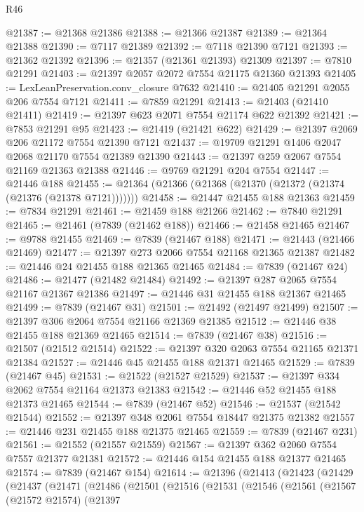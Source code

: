 \begin{lexlean}{R46}
\begin{coremodule}
@21387 := @21368 @21386
@21388 := @21366 @21387
@21389 := @21364 @21388
@21390 := @7117 @21389
@21392 := @7118 @21390 @7121
@21393 := @21362 @21392
@21396 := @21357 (@21361 @21393) @21309
@21397 := @7810 @21291
@21403 := @21397 @2057 @2072 @7554 @21175 @21360 @21393
@21405 := LexLeanPreservation.conv_closure @7632
@21410 := @21405 @21291 @2055 @206 @7554 @7121
@21411 := @7859 @21291
@21413 := @21403 (@21410 @21411)
@21419 := @21397 @623 @2071 @7554 @21174 @622 @21392
@21421 := @7853 @21291 @95
@21423 := @21419 (@21421 @622)
@21429 := @21397 @2069 @206 @21172 @7554 @21390 @7121
@21437 := @19709 @21291 @1406 @2047 @2068 @21170 @7554 @21389 @21390
@21443 := @21397 @259 @2067 @7554 @21169 @21363 @21388
@21446 := @9769 @21291 @204 @7554
@21447 := @21446 @188
@21455 := @21364 (@21366 (@21368 (@21370 (@21372 (@21374 (@21376 (@21378 @7121)))))))
@21458 := @21447 @21455 @188 @21363
@21459 := @7834 @21291
@21461 := @21459 @188 @21266
@21462 := @7840 @21291
@21465 := @21461 (@7839 (@21462 @188))
@21466 := @21458 @21465
@21467 := @9788 @21455
@21469 := @7839 (@21467 @188)
@21471 := @21443 (@21466 @21469)
@21477 := @21397 @273 @2066 @7554 @21168 @21365 @21387
@21482 := @21446 @24 @21455 @188 @21365 @21465
@21484 := @7839 (@21467 @24)
@21486 := @21477 (@21482 @21484)
@21492 := @21397 @287 @2065 @7554 @21167 @21367 @21386
@21497 := @21446 @31 @21455 @188 @21367 @21465
@21499 := @7839 (@21467 @31)
@21501 := @21492 (@21497 @21499)
@21507 := @21397 @306 @2064 @7554 @21166 @21369 @21385
@21512 := @21446 @38 @21455 @188 @21369 @21465
@21514 := @7839 (@21467 @38)
@21516 := @21507 (@21512 @21514)
@21522 := @21397 @320 @2063 @7554 @21165 @21371 @21384
@21527 := @21446 @45 @21455 @188 @21371 @21465
@21529 := @7839 (@21467 @45)
@21531 := @21522 (@21527 @21529)
@21537 := @21397 @334 @2062 @7554 @21164 @21373 @21383
@21542 := @21446 @52 @21455 @188 @21373 @21465
@21544 := @7839 (@21467 @52)
@21546 := @21537 (@21542 @21544)
@21552 := @21397 @348 @2061 @7554 @18447 @21375 @21382
@21557 := @21446 @231 @21455 @188 @21375 @21465
@21559 := @7839 (@21467 @231)
@21561 := @21552 (@21557 @21559)
@21567 := @21397 @362 @2060 @7554 @7557 @21377 @21381
@21572 := @21446 @154 @21455 @188 @21377 @21465
@21574 := @7839 (@21467 @154)
@21614 := @21396
    (@21413
      (@21423
        (@21429
          (@21437
            (@21471
              (@21486
                (@21501
                  (@21516
                    (@21531
                      (@21546
                        (@21561
                          (@21567
                            (@21572 @21574)
                            (@21397

\end{coremodule}
\end{lexlean}
